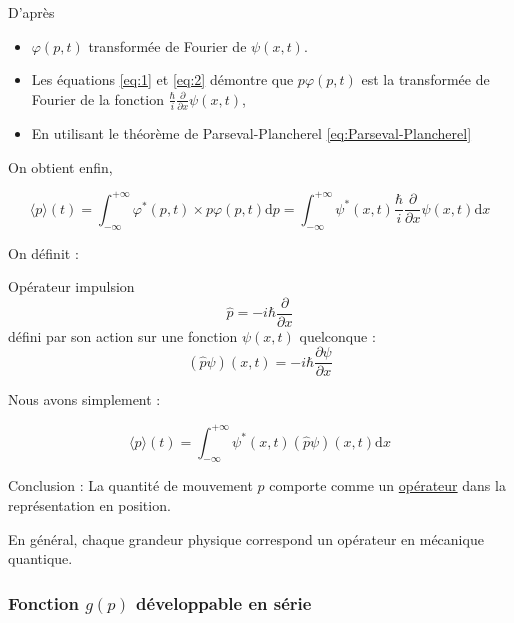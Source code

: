 D'après 
\begin{itemize}

  \item $\varphi(p,t)$ transformée de Fourier de $\psi(x,t)$.
  \item Les équations \ref{eq:1} et \ref{eq:2} démontre que $p \varphi(p,t)$ est la transformée de Fourier de la fonction $\frac{\hbar}{i} \frac{\partial }{\partial x} \psi(x,t)$,
  \item En utilisant le théorème de Parseval-Plancherel \ref{eq:Parseval-Plancherel}
    

\end{itemize}

On obtient enfin,


\begin{equation}
  \boxed{\langle p \rangle(t) = \int_{- \infty}^{+ \infty} \varphi ^{*}(p,t) \times p \varphi(p,t) \mathrm{d}p = \int_{- \infty}^{+ \infty} \psi ^{*}(x, t) \frac{\hbar}{i}  \frac{\partial }{\partial x} \psi (x,t) \mathrm{d}x}
\end{equation}

On définit :
\begin{Definition}[colbacktitle=red!75!black]{Opérateur impulsion}{}
\begin{equation}
  \hat{p} = - i \hbar \frac{\partial }{\partial x} 
  \label{eq:Opérateur impulsion}
\end{equation}
défini par son action sur une fonction $\psi(x,t)$ quelconque :
\begin{equation}
  (\hat{p}\psi)(x, t) = - i \hbar \frac{\partial \psi}{\partial x} 
\end{equation}
\end{Definition}

Nous avons simplement : 


\begin{equation}
  \boxed{\langle p \rangle(t) = \int_{- \infty}^{+ \infty} \psi ^{*}(x,t) (\hat{p} \psi)(x,t) \mathrm{d} x} 
\end{equation}


Conclusion : La quantité de mouvement $p$ comporte comme un \underline{opérateur} dans la représentation en position.

\begin{note}{}{}
  En général, chaque grandeur physique correspond un opérateur en mécanique quantique.
\end{note}


\subsubsection{Fonction $g(p)$ développable en série} %
\label{sec:Fonction $g(p)$ développable en série}


